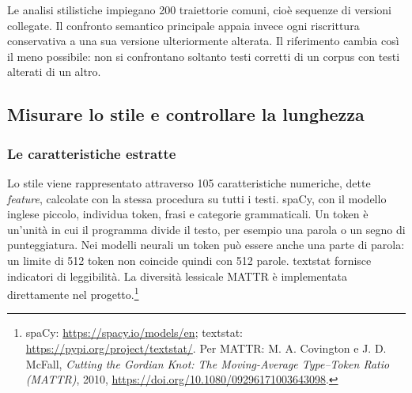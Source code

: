 Le analisi stilistiche impiegano 200 traiettorie comuni, cioè sequenze di versioni collegate. Il confronto semantico principale appaia invece ogni riscrittura conservativa a una sua versione ulteriormente alterata. Il riferimento cambia così il meno possibile: non si confrontano soltanto testi corretti di un corpus con testi alterati di un altro.

\subsection{Misurare lo stile e controllare la lunghezza}\label{misurare-lo-stile-e-controllare-la-lunghezza}

\subsubsection{Le caratteristiche estratte}\label{le-caratteristiche-estratte}

Lo stile viene rappresentato attraverso 105 caratteristiche numeriche, dette \emph{feature}, calcolate con la stessa procedura su tutti i testi. spaCy, con il modello inglese piccolo, individua token, frasi e categorie grammaticali. Un token è un'unità in cui il programma divide il testo, per esempio una parola o un segno di punteggiatura. Nei modelli neurali un token può essere anche una parte di parola: un limite di 512 token non coincide quindi con 512 parole. textstat fornisce indicatori di leggibilità. La diversità lessicale MATTR è implementata direttamente nel progetto.\footnote{spaCy: \url{https://spacy.io/models/en}; textstat: \url{https://pypi.org/project/textstat/}. Per MATTR: M. A. Covington e J. D. McFall, \emph{Cutting the Gordian Knot: The Moving-Average Type--Token Ratio (MATTR)}, 2010, \url{https://doi.org/10.1080/09296171003643098}.}

